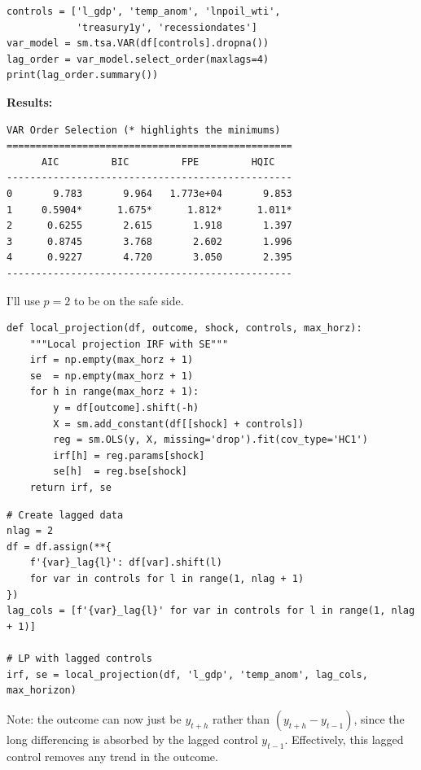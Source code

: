 \begin{frame}[fragile]
\footnotesize
\begin{verbatim}
controls = ['l_gdp', 'temp_anom', 'lnpoil_wti',
            'treasury1y', 'recessiondates']
var_model = sm.tsa.VAR(df[controls].dropna())
lag_order = var_model.select_order(maxlags=4)
print(lag_order.summary())
\end{verbatim}
\bigskip
\normalsize

\textbf{Results:}
\footnotesize
\begin{verbatim}
VAR Order Selection (* highlights the minimums) 
=================================================
      AIC         BIC         FPE         HQIC   
-------------------------------------------------
0       9.783       9.964   1.773e+04       9.853
1     0.5904*      1.675*      1.812*      1.011*
2      0.6255       2.615       1.918       1.397
3      0.8745       3.768       2.602       1.996
4      0.9227       4.720       3.050       2.395
-------------------------------------------------
\end{verbatim}
\smallskip
\normalsize
I'll use $p=2$ to be on the safe side.
\end{frame}

\begin{frame}[fragile]
\footnotesize
\begin{verbatim}
def local_projection(df, outcome, shock, controls, max_horz):
    """Local projection IRF with SE"""
    irf = np.empty(max_horz + 1)
    se  = np.empty(max_horz + 1)
    for h in range(max_horz + 1):
        y = df[outcome].shift(-h)
        X = sm.add_constant(df[[shock] + controls])
        reg = sm.OLS(y, X, missing='drop').fit(cov_type='HC1')
        irf[h] = reg.params[shock]
        se[h]  = reg.bse[shock]
    return irf, se
\end{verbatim}
\end{frame}

\begin{frame}[fragile]
\scriptsize
\begin{verbatim}
# Create lagged data
nlag = 2
df = df.assign(**{
    f'{var}_lag{l}': df[var].shift(l)
    for var in controls for l in range(1, nlag + 1)
})
lag_cols = [f'{var}_lag{l}' for var in controls for l in range(1, nlag + 1)]

# LP with lagged controls
irf, se = local_projection(df, 'l_gdp', 'temp_anom', lag_cols, max_horizon)
\end{verbatim}
\bigskip
\small
Note: the outcome can now just be $y_{t+h}$ rather than $(y_{t+h}-y_{t-1})$, since the long differencing is absorbed by the lagged control $y_{t-1}$. Effectively, this lagged control removes any trend in the outcome.
\end{frame}

